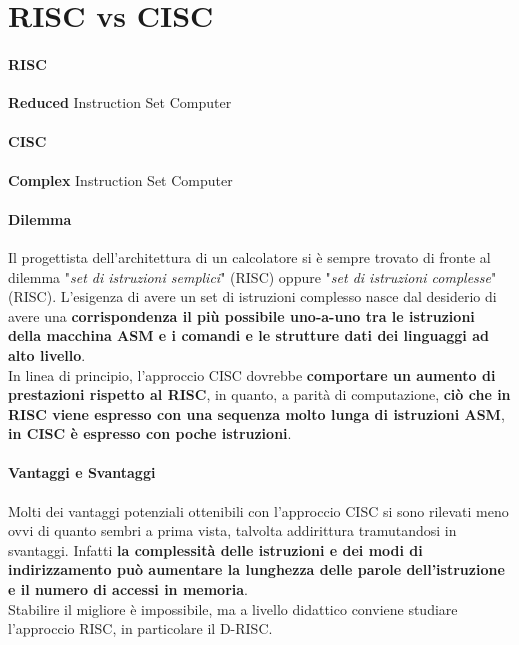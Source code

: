 \documentclass[10pt]{report}
\begin{document}
\section{RISC vs CISC}
\paragraph{RISC} \textbf{Reduced} Instruction Set Computer
\paragraph{CISC} \textbf{Complex} Instruction Set Computer
\paragraph{Dilemma} Il progettista dell'architettura di un calcolatore si è sempre trovato di fronte al dilemma "\textit{set di istruzioni semplici}" (RISC) oppure "\textit{set di istruzioni complesse}" (RISC). L'esigenza di avere un set di istruzioni complesso nasce dal desiderio di avere una \textbf{corrispondenza il più possibile uno-a-uno tra le istruzioni della macchina ASM e i comandi e le strutture dati dei linguaggi ad alto livello}.\\
In linea di principio, l'approccio CISC dovrebbe \textbf{comportare un aumento di prestazioni rispetto al RISC}, in quanto, a parità di computazione, \textbf{ciò che in RISC viene espresso con una sequenza molto lunga di istruzioni ASM}, \textbf{in CISC è espresso con poche istruzioni}.
\paragraph{Vantaggi e Svantaggi} Molti dei vantaggi potenziali ottenibili con l'approccio CISC si sono rilevati meno ovvi di quanto sembri a prima vista, talvolta addirittura tramutandosi in svantaggi. Infatti \textbf{la complessità delle istruzioni e dei modi di indirizzamento può aumentare la lunghezza delle parole dell'istruzione e il numero di accessi in memoria}.\\
Stabilire il migliore è impossibile, ma a livello didattico conviene studiare l'approccio RISC, in particolare il D-RISC.
\pagebreak
\end{document}
